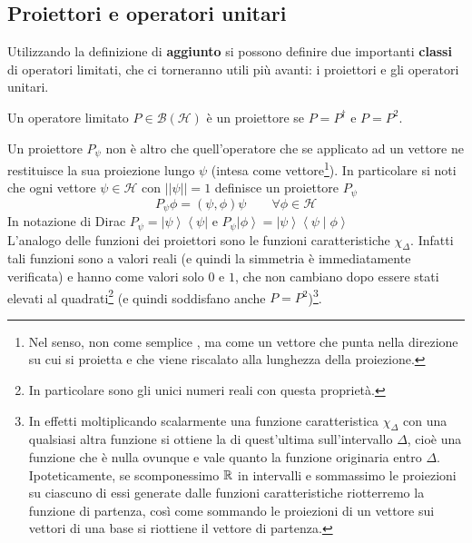 %

%


\subsection{Proiettori e operatori unitari}
Utilizzando la definizione di \textbf{aggiunto} si possono definire due importanti \textbf{classi} di operatori limitati, che ci torneranno utili più avanti: i proiettori e gli operatori unitari.
\begin{dfn}[Proiettore]
 Un operatore limitato $P\in\mathcal{B}(\mathcal{H})$ è un proiettore se $P=P^\dag$ e $P=P^2$.
\end{dfn}
Un proiettore $P_\psi$ non è altro che quell'operatore che se applicato ad un vettore ne restituisce la sua proiezione lungo $\psi$ (intesa come vettore\footnote{Nel senso, non come semplice , ma come un vettore che punta nella direzione su cui si proietta e che viene riscalato alla lunghezza della proiezione.}).
In particolare si noti che ogni vettore $\psi\in\mathcal{H}$ con $\left|\left|\psi\right|\right|=1$ definisce un proiettore $P_\psi$
\begin{equation}
P_\psi\phi=\left(\psi,\phi\right)\psi\qquad \forall\phi\in\mathcal{H}
\label{eqn:proiettore}
\end{equation}
In notazione di Dirac $P_\psi=\left|\psi\right\rangle\left\langle\psi\right|$ e $P_\psi\left|\phi\right\rangle=\left|\psi\right\rangle\left\langle\psi\middle|\phi\right\rangle$\\
L'analogo delle funzioni dei proiettori sono le funzioni caratteristiche $\chi_\Delta$. Infatti tali funzioni sono a valori reali (e quindi la simmetria è immediatamente verificata) e hanno come valori solo $0$ e $1$, che non cambiano dopo essere stati elevati al quadrati\footnote{In particolare sono gli unici numeri reali con questa proprietà.} (e quindi soddisfano anche $P=P^2$)\footnote{In effetti moltiplicando scalarmente una funzione caratteristica $\chi_\Delta$ con una qualsiasi altra funzione si ottiene la  di quest'ultima sull'intervallo $\Delta$, cioè una funzione che è nulla ovunque e vale quanto la funzione originaria entro $\Delta$. Ipoteticamente, se scomponessimo $\mathbb{R}$ in intervalli e sommassimo le proiezioni su ciascuno di essi generate dalle funzioni caratteristiche riotterremo la funzione di partenza, così come sommando le proiezioni di un vettore sui vettori di una base si riottiene il vettore di partenza.}.

